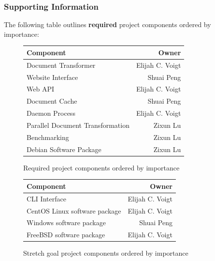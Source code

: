\subsubsection{Supporting Information}


The following table outlines \textbf{required} project components ordered by importance:

\begin{figure}
\begin{center}
    \begin{tabular}{ | l | r | }
    \hline
      Component & Owner \\ \hline
      Document Transformer & Elijah C. Voigt \\ \hline
      Website Interface & Shuai Peng \\ \hline
      Web API & Elijah C. Voigt \\ \hline
      Document Cache & Shuai Peng \\ \hline
      Daemon Process & Elijah C. Voigt \\ \hline
      Parallel Document Transformation & Zixun Lu \\ \hline
      Benchmarking & Zixun Lu \\ \hline
      Debian Software Package & Zixun Lu \\ \hline
    \end{tabular}
\end{center}
\caption{Required project components ordered by importance}
\end{figure}

\begin{figure}
\begin{center}
    \begin{tabular}{ | l | r | }
    \hline
      Component & Owner \\ \hline
      CLI Interface & Elijah C. Voigt \\ \hline
      CentOS Linux software package & Elijah C. Voigt \\ \hline
      Windows software package & Shuai Peng \\ \hline
      FreeBSD software package & Elijah C. Voigt  \\ \hline
    \end{tabular}
\end{center}
\caption{Stretch goal project components ordered by importance}
\end{figure}

